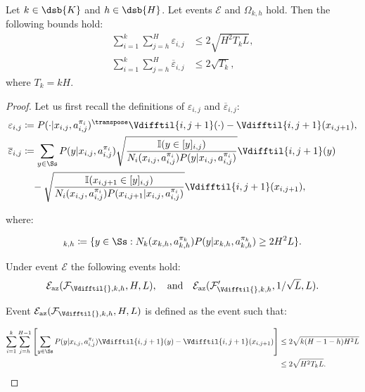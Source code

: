 
\begin{lemma}
\label{lem:sum_eps}
    Let $k \in \dsb{K}$ and $h \in \dsb{H}$. Let events $\mathcal{E}$ and $\Omega_{k,h}$ hold. Then the following bounds hold:
    \begin{align*}
        \sum_{i=1}^k \sum_{j=h}^H \varepsilon_{i,j} &\le 2\sqrt{H^2 T_k L}, \\
        \sum_{i=1}^k \sum_{j=h}^H \overline{\varepsilon}_{i,j} &\le 2 \sqrt{T_k},
    \end{align*}
    where $T_k = kH$.
\end{lemma}

\begin{proof}
Let us first recall the definitions of $\varepsilon_{i,j}$ and $\overline{\varepsilon}_{i,j}$:
\begin{align*}
    \varepsilon_{i,j} &\coloneqq P(\cdot | x_{i,j}, a_{i,j}^{\pi_i})^\transpose \Vdifftil{i,j+1}(\cdot) - \Vdifftil{i,j+1}(x_{i,j+1}), \\
    \overline{\varepsilon}_{i,j} &\coloneqq \sum_{y\in\Ss} P(y|x_{i,j},a_{i,j}^{\pi_i}) \sqrt{\frac{\mathbb{I}(y \in [y]_{i,j})}{N_i(x_{i,j},a_{i,j}^{\pi_i})P(y|x_{i,j},a_{i,j}^{\pi_i})}} \Vdifftil{i,j+1}(y) \\
    &\quad - \sqrt{\frac{\mathbb{I}(x_{i,j+1} \in [y]_{i,j})}{N_i(x_{i,j},a_{i,j}^{\pi_i})P(x_{i,j+1}|x_{i,j},a_{i,j}^{\pi_i})}} \Vdifftil{i,j+1}(x_{i,j+1}),
\end{align*}

where:

\begin{equation*}
    [y]_{k,h} \coloneqq \{ y \in \Ss : N_k(x_{k,h}, a_{k,h}^{\pi_k}) P(y | x_{k,h}, a_{k,h}^{\pi_k}) \ge 2 H^2L \}.
\end{equation*}

Under event $\mathcal{E}$ the following events hold:
\begin{equation*}
    \mathcal{E}_{\mathrm{az}}(\mathcal{F}_{\Vdifftil{}, k, h}, H, L), \quad\text{and}\quad
    \mathcal{E}_{\mathrm{az}}(\mathcal{F}_{\Vdifftil{}, k, h}', 1/\sqrt{L}, L).
\end{equation*}

Event $\mathcal{E}_{\mathrm{az}}(\mathcal{F}_{\Vdifftil{}, k, h}, H, L)$ is defined as the event such that:

\begin{align*}
    \sum_{i=1}^k \sum_{j=h}^{H-1} \left[ \sum_{y\in\Ss} P(y|x_{i,j},a_{i,j}^{\pi_i})\Vdifftil{i,j+1}(y) - \Vdifftil{i,j+1}(x_{i,j+1}) \right] &\le 2 \sqrt{k (H-1-h) H^2 L} \\
    &\le 2 \sqrt{H^2 T_k L}.
\end{align*}


\end{proof}
